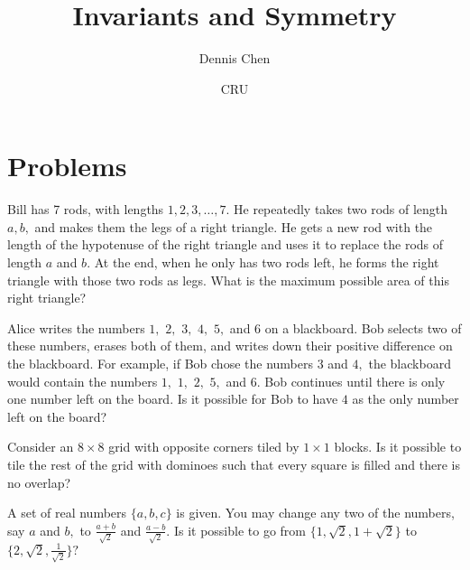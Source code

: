 \documentclass{article}
\title{Invariants and Symmetry}
\author{Dennis Chen}
\date{CRU}
\begin{document}
\maketitle



\pagebreak

\section{Problems}

\begin{prob}{2}
Bill has 7 rods, with lengths $1,2,3,\dots,7.$ He repeatedly takes two rods of length $a,b,$ and makes them the legs of a right triangle. He gets a new rod with the length of the hypotenuse of the right triangle and uses it to replace the rods of length $a$ and $b.$ At the end, when he only has two rods left, he forms the right triangle with those two rods as legs. What is the maximum possible area of this right triangle?
\end{prob}

\begin{prob}[]{2}
Alice writes the numbers $1,$ $2,$ $3,$ $4,$ $5,$ and $6$ on a blackboard. Bob selects two of these numbers, erases both of them, and writes down their positive difference on the blackboard. For example, if Bob chose the numbers $3$ and $4,$ the blackboard would contain the numbers $1,$ $1,$ $2,$ $5,$ and $6.$ Bob continues until there is only one number left on the board. Is it possible for Bob to have $4$ as the only number left on the board?
\end{prob}

\begin{prob}[]{3}
Consider an $8\times 8$ grid with opposite corners tiled by $1\times 1$ blocks. Is it possible to tile the rest of the grid with dominoes such that every square is filled and there is no overlap?
\end{prob}

\begin{prob}[]{3}
A set of real numbers $\{a,b,c\}$ is given. You may change any two of the numbers, say $a$ and $b,$ to $\frac{a+b}{\sqrt{2}}$ and $\frac{a-b}{\sqrt{2}}.$ Is it possible to go from $\{1,\sqrt{2},1+\sqrt{2}\}$ to $\{2,\sqrt{2},\frac{1}{\sqrt{2}}\}?$
\end{prob}
\end{document}
